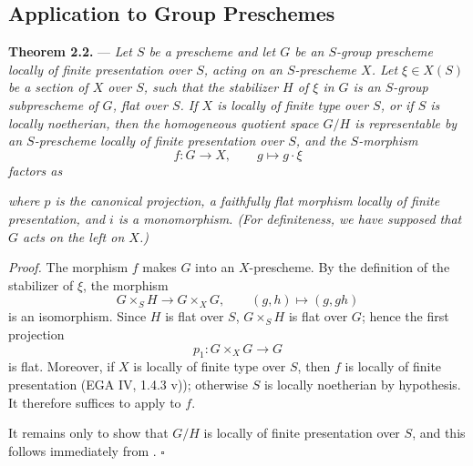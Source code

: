 \subsection*{Application to Group Preschemes}

\noindent{}%
\textbf{Theorem 2.2.} --- \textit{Let \(S\) be a prescheme and let
\(G\) be an \(S\)-group prescheme locally of finite presentation
over \(S\), acting on an \(S\)-prescheme \(X\). Let
\(\xi\in X(S)\) be a section of \(X\) over \(S\), such that the
stabilizer \(H\) of \(\xi\) in \(G\) is an \(S\)-group
subprescheme of \(G\), flat over \(S\). If \(X\) is locally of
finite type over \(S\), or if \(S\) is locally noetherian, then the
homogeneous quotient space \(G/H\) is representable by an
\(S\)-prescheme locally of finite presentation over \(S\), and the
\(S\)-morphism}
\[
  f:G\longrightarrow X,\qquad g\longmapsto g\cdot\xi
\]
\textit{factors as}
\begin{center}


\end{center}
\textit{where \(p\) is the canonical projection, a faithfully flat
morphism locally of finite presentation, and \(i\) is a
monomorphism. (For definiteness, we have supposed that \(G\) acts
on the left on \(X\).)}

\medskip
\noindent\textit{Proof.}
The morphism \(f\) makes \(G\) into an \(X\)-prescheme. By the
definition of the stabilizer of \(\xi\), the morphism
\[
  G\times_S H\longrightarrow G\times_X G,\qquad
  (g,h)\longmapsto(g,gh)
\]
is an isomorphism. Since \(H\) is flat over \(S\),
\(G\times_S H\) is flat over \(G\); hence the first projection
\[
  p_1:G\times_X G\longrightarrow G
\]
is flat. Moreover, if \(X\) is locally of finite type over \(S\),
then \(f\) is locally of finite presentation (EGA IV, 1.4.3 v));
otherwise \(S\) is locally noetherian by hypothesis. It therefore
suffices to apply  to \(f\).

It remains only to show that \(G/H\) is locally of finite
presentation over \(S\), and this follows immediately from
.
\hfill\(\square\)

